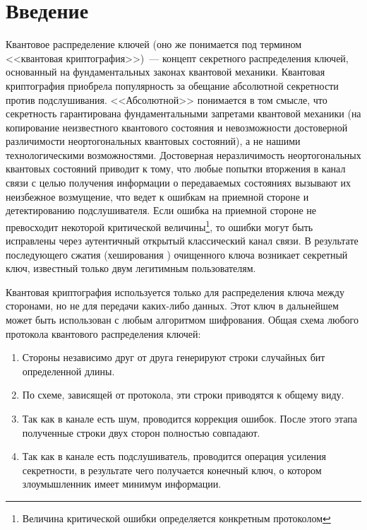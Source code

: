 \chapter*{Введение}				%
\setcounter{page}{3}

Квантовое распределение ключей (оно же понимается под термином <<квантовая криптография>>)~--- концепт секретного распределения ключей, основанный на фундаментальных законах квантовой механики.
Квантовая криптография \cite{bb84, e91, gisin2002Quacry, scarani2009secpraquakeydis, hughes2011Refquacry, lam2013QuacryConimp} приобрела популярность за обещание абсолютной секретности против подслушивания. <<Абсолютной>> понимается в том смысле, что секретность гарантирована
фундаментальными запретами квантовой механики (на копирование неизвестного квантового состояния и невозможности достоверной различимости неортогональных квантовых состояний)\cite{bb84, non_orthogonal_states_discrimination_theorem, no_cloning_theorem}, 
а не нашими технологическими возможностями. Достоверная неразличимость неортогональных квантовых состояний приводит к тому, что любые попытки вторжения в канал связи с целью получения информации о передаваемых состояниях вызывают их неизбежное возмущение, что ведет к ошибкам на приемной стороне и детектированию подслушивателя.
Если ошибка на приемной стороне не превосходит некоторой критической величины\footnote{Величина критической ошибки определяется конкретным протоколом}, то ошибки могут быть исправлены через аутентичный открытый классический канал связи. В результате последующего сжатия (хеширования \cite{privacy_amplification}) очищенного ключа возникает секретный ключ, известный только двум легитимным пользователям.

Квантовая криптография используется только для распределения ключа между сторонами, но не для передачи каких-либо данных. Этот ключ в дальнейшем может быть использован с любым алгоритмом шифрования.
Общая схема любого протокола квантового распределения ключей:
\begin{enumerate}
  \item Стороны независимо друг от друга генерируют строки случайных бит определенной длины.
  \item По схеме, зависящей от протокола, эти строки приводятся к общему виду.
  \item Так как в канале есть шум, проводится коррекция ошибок. После этого этапа полученные строки двух сторон полностью совпадают.
  \item Так как в канале есть подслушиватель, проводится операция усиления секретности, в результате чего получается конечный ключ, о котором злоумышленник имеет минимум информации.
\end{enumerate}

